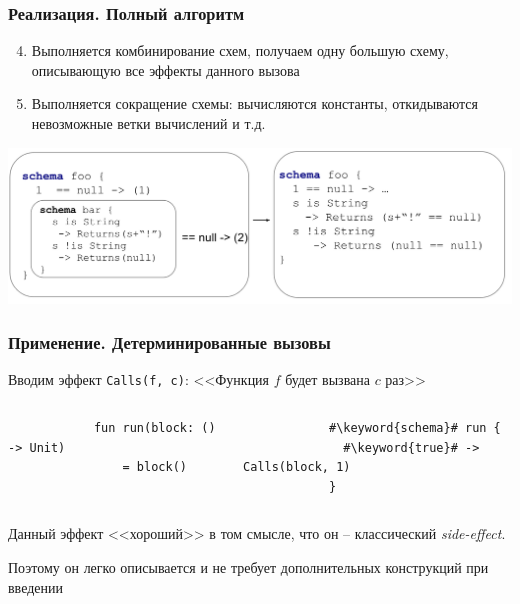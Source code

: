 \documentclass{beamer}
\newcommand{\code}[1]{\texttt{#1}}
\newcommand{\keyword}[1]{\textbf{\textcolor{schema-keyword}{#1}}}
\begin{document}
\begin{frame}[t]\frametitle{Реализация. Полный алгоритм}
    
    \begin{enumerate}
    \setcounter{enumi}{3}

      \item Выполняется комбинирование схем, получаем одну большую схему, описывающую все эффекты данного вызова
      \item Выполняется сокращение схемы: вычисляются константы, откидываются невозможные ветки вычислений и т.д.
    \end{enumerate}
    
    \centerline{\includegraphics[width=\paperwidth]{pipeline-2} }
\end{frame}

\begin{frame}[fragile, t]\frametitle{Применение. Детерминированные вызовы}
    Вводим эффект \code{Calls(f, c)}: <<Функция $f$ будет вызвана $c$ раз>>
    
    \begin{columns}[T]
        
        \begin{verbatim}
            fun run(block: () -> Unit) 
                = block()          
        \end{verbatim}
        
                
        
        \begin{verbatim}
            #\keyword{schema}# run {
              #\keyword{true}# -> Calls(block, 1)
            }
        \end{verbatim}
    \end{columns}
    
    \bigskip
    Данный эффект <<хороший>> в том смысле, что он -- классический \emph{side-effect}.
    
    Поэтому он легко описывается и не требует дополнительных конструкций при введении
\end{frame}
\end{document}
